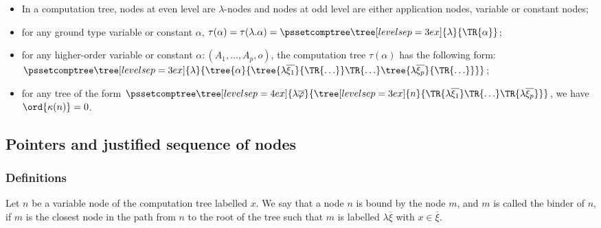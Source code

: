 \begin{remark} \hfill
\begin{itemize}
\item In a computation tree, nodes at even level are $\lambda$-nodes and nodes at odd level are either application nodes,
variable or constant nodes;

\item for any ground type variable or constant $\alpha$,
$\tau(\alpha) = \tau(\lambda . \alpha) =
\pssetcomptree\tree[levelsep=3ex]{\lambda}{ \TR{\alpha} }$;

\item for any higher-order variable or constant $\alpha : (A_1,\ldots,A_p,o)$, the computation tree $\tau(\alpha)$ has the following form:
$ \pssetcomptree\tree[levelsep=3ex]{\lambda}{\tree{\alpha} {
                \tree{\lambda \overline{\xi_1}}{\TR{\ldots}}
                \TR{\ldots} \tree{\lambda
                \overline{\xi_p}}{\TR{\ldots}} }
        }
$;

\item for any tree of the form
        $ \pssetcomptree\tree[levelsep=4ex]{\lambda
            \overline{\varphi}} { \tree[levelsep=3ex]{n}
            {\TR{\lambda
                \overline{\xi_1}} \TR{\ldots} \TR{\lambda
                \overline{\xi_p}}}
            }
        $,
    we have $\ord{\kappa(n)}=0$.

\end{itemize}
\end{remark}


\subsection{Pointers and justified sequence of nodes}
\subsubsection{Definitions}
\begin{definition}[Binder]
Let $n$ be a variable node of the computation tree labelled $x$. We
say that a node $n$ is bound by the node $m$, and $m$ is called the
binder of $n$, if $m$ is the closest node in the path from $n$ to
the root of the tree such that $m$ is labelled $\lambda
\overline{\xi}$ with $x\in \overline{\xi}$.
\end{definition}

